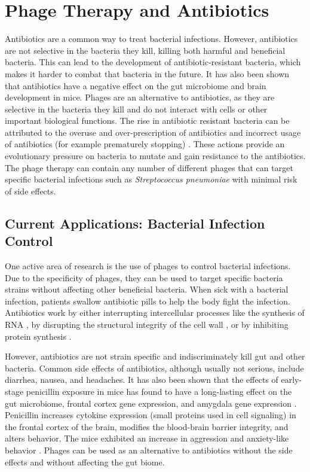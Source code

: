 \section{Phage Therapy and Antibiotics}
\label{sec:AppendixB:phage_therapy_and_antibiotics}
Antibiotics are a common way to treat bacterial infections.
However, antibiotics are not selective in the bacteria they kill, killing both harmful and beneficial bacteria.
This can lead to the development of antibiotic-resistant bacteria, which makes it harder to combat that bacteria in the future.
It has also been shown that antibiotics have a negative effect on the gut microbiome and brain development in mice.
Phages are an alternative to antibiotics, as they are selective in the bacteria they kill and do not interact with cells or other important biological functions.
The rise in antibiotic resistant bacteria can be attributed to the overuse and over-prescription of antibiotics and incorrect usage of antibiotics (for example prematurely stopping) \cite{odonkorBacteriaResistanceAntibiotics2011}.
These actions provide an evolutionary pressure on bacteria to mutate and gain resistance to the antibiotics. 
The phage therapy can contain any number of different phages that can target specific bacterial infections such as \textit{Streptococcus pneumoniae} with minimal risk of side effects.

\subsection{Current Applications: Bacterial Infection Control}
One active area of research is the use of phages to control bacterial infections.
Due to the specificity of phages, they can be used to target specific bacteria strains without affecting other beneficial bacteria.
When sick with a bacterial infection, patients swallow antibiotic pills to help the body fight the infection.
Antibiotics work by either interrupting intercellular processes like the synthesis of RNA \cite{flossRifamycinModeActionResistance2005}, by disrupting the structural integrity of the cell wall \cite{tomaszMechanismIrreversibleAntimicrobial1979}, or by inhibiting protein synthesis \cite{vakulenkoVersatilityAminoglycosidesProspects2003}.

However, antibiotics are not strain specific and indiscriminately kill gut and other bacteria.
Common side effects of antibiotics, although usually not serious, include diarrhea, nausea, and headaches.
It has also been shown that the effects of early-stage penicillin exposure in mice has found to have a long-lasting effect on the gut microbiome, frontal cortex gene expression, and amygdala gene expression \cite{volkovaEffectsEarlylifePenicillin2021}.
Penicillin increases cytokine expression (small proteins used in cell signaling) in the frontal cortex of the brain, modifies the blood-brain barrier integrity, and alters behavior.
The mice exhibited an increase in aggression and anxiety-like behavior \cite{leclercqLowdosePenicillinEarly2017}.
Phages can be used as an alternative to antibiotics without the side effects and without affecting the gut biome. 

